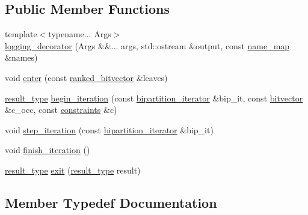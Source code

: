 \subsection*{Public Member Functions}
\begin{DoxyCompactItemize}
\item 
{\footnotesize template$<$typename... Args$>$ }\\\hyperlink{classterraces_1_1debug_1_1variants_1_1logging__decorator_a6e9f97ef90017d53d69241a9b827014e}{logging\+\_\+decorator} (Args \&\&... args, std\+::ostream \&output, const \hyperlink{namespaceterraces_a4ef0217fe5aed881737d9bc5a8d45dca}{name\+\_\+map} \&names)
\item 
void \hyperlink{classterraces_1_1debug_1_1variants_1_1logging__decorator_a05818c97704f093630e84b915b58a5cd}{enter} (const \hyperlink{namespaceterraces_acc45ec9c561024c50ecbce5b6738ba08}{ranked\+\_\+bitvector} \&leaves)
\item 
\hyperlink{classterraces_1_1debug_1_1variants_1_1logging__decorator_a7c08c8ede1f8c884a3bab0437b244f55}{result\+\_\+type} \hyperlink{classterraces_1_1debug_1_1variants_1_1logging__decorator_abd1db25829d4a60328582e094d36c4fd}{begin\+\_\+iteration} (const \hyperlink{classterraces_1_1bipartition__iterator}{bipartition\+\_\+iterator} \&bip\+\_\+it, const \hyperlink{namespaceterraces_a1b526fb554dff829f7ad51eb21d5ed06}{bitvector} \&c\+\_\+occ, const \hyperlink{namespaceterraces_a6f603ffd30ed4d902fce6424492e0581}{constraints} \&c)
\item 
void \hyperlink{classterraces_1_1debug_1_1variants_1_1logging__decorator_abf7256cde9b9aada061a80c8dd7a011f}{step\+\_\+iteration} (const \hyperlink{classterraces_1_1bipartition__iterator}{bipartition\+\_\+iterator} \&bip\+\_\+it)
\item 
void \hyperlink{classterraces_1_1debug_1_1variants_1_1logging__decorator_aed1d3afe4d25a5b08be18c8576b98dd8}{finish\+\_\+iteration} ()
\item 
\hyperlink{classterraces_1_1debug_1_1variants_1_1logging__decorator_a7c08c8ede1f8c884a3bab0437b244f55}{result\+\_\+type} \hyperlink{classterraces_1_1debug_1_1variants_1_1logging__decorator_a8279aabed27469c45219527121f5948b}{exit} (\hyperlink{classterraces_1_1debug_1_1variants_1_1logging__decorator_a7c08c8ede1f8c884a3bab0437b244f55}{result\+\_\+type} result)
\end{DoxyCompactItemize}


\subsection{Member Typedef Documentation}
\mbox{\label{classterraces_1_1debug_1_1variants_1_1logging__decorator_a7c08c8ede1f8c884a3bab0437b244f55}} 
